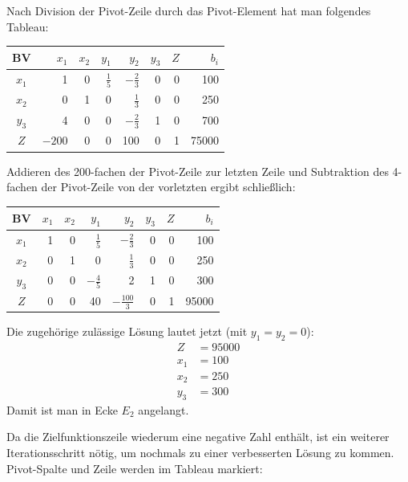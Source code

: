 Nach Division der Pivot-Zeile durch das Pivot-Element hat man folgendes Tableau:

\begin{center}
  \begin{tabular}{|c|r|r|r|r|r|r|r|}
    \hline
    BV & $x_1$ & $x_2$ & $y_1$ & $y_2$ & $y_3$ & $Z$ & $b_i$\\
    \hline
    $x_1$ & 1 & 0 & $\tfrac{1}{5}$ & $-\tfrac{2}{3}$ & 0 & 0 & 100\\
    $x_2$ & 0 & 1 & 0 & $\tfrac{1}{3}$ & 0 & 0 & 250\\
    $y_3$ & 4 & 0 & 0 & $-\tfrac{2}{3}$ & 1 & 0 & 700\\
    $Z$ & $-200$ & 0 & 0 & 100 & 0 & 1 & 75000\\
    \hline
  \end{tabular}
\end{center}

Addieren des 200-fachen der Pivot-Zeile zur letzten Zeile und Subtraktion des 4-fachen der Pivot-Zeile von der vorletzten ergibt schließlich:

\begin{center}
  \begin{tabular}{|c|r|r|r|r|r|r|r|}
    \hline
    BV & $x_1$ & $x_2$ & $y_1$ & $y_2$ & $y_3$ & $Z$ & $b_i$\\
    \hline
    $x_1$ & 1 & 0 & $\tfrac{1}{5}$ & $-\tfrac{2}{3}$ & 0 & 0 & 100\\
    $x_2$ & 0 & 1 & 0 & $\tfrac{1}{3}$ & 0 & 0 & 250\\
    $y_3$ & 0 & 0 & $-\tfrac{4}{5}$ & 2 & 1 & 0 & 300\\
    $Z$ & 0 & 0 & 40 & $-\tfrac{100}{3}$ & 0 & 1 & 95000\\
    \hline
  \end{tabular}
\end{center}

Die zugehörige zulässige Lösung lautet jetzt (mit $y_1 = y_2 = 0$):
\begin{align*}
  Z &= 95000\\
  x_1 &= 100\\
  x_2 &= 250\\
  y_3 &= 300
\end{align*}
Damit ist man in Ecke $E_2$ angelangt.

Da die Zielfunktionszeile wiederum eine negative Zahl enthält, ist ein weiterer Iterationsschritt nötig, um nochmals zu einer verbesserten Lösung zu kommen. Pivot-Spalte und Zeile werden im Tableau markiert:

